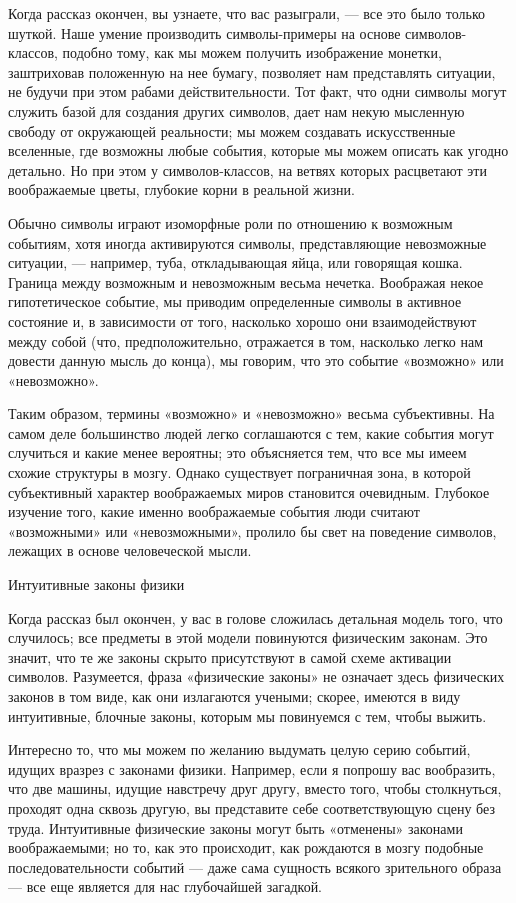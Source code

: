 \documentclass[../main.tex]{subfiles}
\begin{document}
Когда рассказ окончен, вы узнаете, что вас разыграли, --- все это было только шуткой. Наше умение производить символы-примеры на основе символов-классов, подобно тому, как мы можем получить изображение монетки, заштриховав положенную на нее бумагу, позволяет нам представлять ситуации, не будучи при этом рабами действительности. Тот факт, что одни символы могут служить базой для создания других символов, дает нам некую мысленную свободу от окружающей реальности; мы можем создавать искусственные вселенные, где возможны любые события, которые мы можем описать как угодно детально. Но при этом у символов-классов, на ветвях которых расцветают эти воображаемые цветы, глубокие корни в реальной жизни.

Обычно символы играют изоморфные роли по отношению к возможным событиям, хотя иногда активируются символы, представляющие невозможные ситуации, --- например, туба, откладывающая яйца, или говорящая кошка. Граница между возможным и невозможным весьма нечетка. Воображая некое гипотетическое событие, мы приводим определенные символы в активное состояние и, в зависимости от того, насколько хорошо они взаимодействуют между собой (что, предположительно, отражается в том, насколько легко нам довести данную мысль до конца), мы говорим, что это событие «возможно» или «невозможно».

Таким образом, термины «возможно» и «невозможно» весьма субъективны. На самом деле большинство людей легко соглашаются с тем, какие события могут случиться и какие менее вероятны; это объясняется тем, что все мы имеем схожие структуры в мозгу. Однако существует пограничная зона, в которой субъективный характер воображаемых миров становится очевидным. Глубокое изучение того, какие именно воображаемые события люди считают «возможными» или «невозможными», пролило бы свет на поведение символов, лежащих в основе человеческой мысли.

Интуитивные законы физики

Когда рассказ был окончен, у вас в голове сложилась детальная модель того, что случилось; все предметы в этой модели повинуются физическим законам. Это значит, что те же законы скрыто присутствуют в самой схеме активации символов. Разумеется, фраза «физические законы» не означает здесь физических законов в том виде, как они излагаются учеными; скорее, имеются в виду интуитивные, блочные законы, которым мы повинуемся с тем, чтобы выжить.

Интересно то, что мы можем по желанию выдумать целую серию событий, идущих вразрез с законами физики. Например, если я попрошу вас вообразить, что две машины, идущие навстречу друг другу, вместо того, чтобы столкнуться, проходят одна сквозь другую, вы представите себе соответствующую сцену без труда. Интуитивные физические законы могут быть «отменены» законами воображаемыми; но то, как это происходит, как рождаются в мозгу подобные последовательности событий --- даже сама сущность всякого зрительного образа --- все еще является для нас глубочайшей загадкой.
\end{document}
